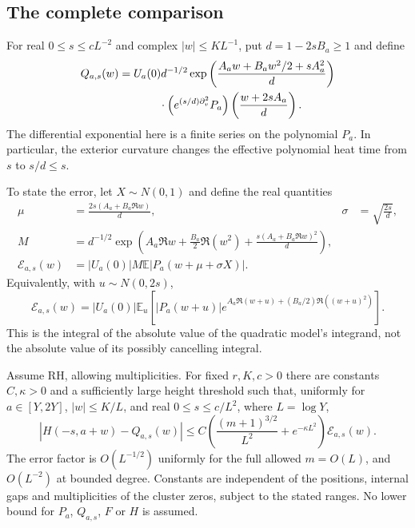 \subsection{The complete comparison}
\label{na-comparison-subsection}

For real $0\le s\le cL^{-2}$ and complex $|w|\le KL^{-1}$, put
$d=1-2sB_a\ge1$ and define
\begin{equation}
 \begin{split}
 Q_{a,s}(w)={}&U_a(0)d^{-1/2}
 \exp\left(\frac{A_aw+B_aw^2/2+sA_a^2}{d}\right)\\
 &\hspace{8mm}\cdot
 \left(e^{(s/d)\partial_v^2}P_a\right)
                  \left(\frac{w+2sA_a}{d}\right).
 \end{split}
 \label{na-quadratic-model}
\end{equation}
The differential exponential here is a finite series on the polynomial
$P_a$. In particular, the exterior curvature changes the effective
polynomial heat time from $s$ to $s/d\le s$.

To state the error, let $X\sim N(0,1)$ and define the real quantities
\begin{align}
 \mu&=\frac{2s(A_a+B_a\Re w)}d,&
 \sigma&=\sqrt{\frac{2s}d},
 \label{na-real-tilt}\\
 M&=d^{-1/2}\exp\left(A_a\Re w+\frac{B_a}2\Re(w^2)
                  +\frac{s(A_a+B_a\Re w)^2}d\right),
 \nonumber\\[-2mm]
 \mathcal E_{a,s}(w)&=|U_a(0)|M
                      \mathbb E|P_a(w+\mu+\sigma X)|.
 \label{na-absolute-envelope}
\end{align}
Equivalently, with $u\sim N(0,2s)$,
\begin{equation}
 \mathcal E_{a,s}(w)=|U_a(0)|\mathbb E_u
 \left[|P_a(w+u)|
 e^{A_a\Re(w+u)+(B_a/2)\Re((w+u)^2)}\right].
 \label{na-envelope-integral}
\end{equation}
This is the integral of the absolute value of the quadratic model's
integrand, not the absolute value of its possibly cancelling integral.

\begin{theorem}
\label{na-main-theorem}
\label{thm:na-comparison}
Assume RH, allowing multiplicities. For fixed $r,K,c>0$ there are
constants $C,\kappa>0$ and a sufficiently large height threshold such
that, uniformly for $a\in[Y,2Y]$, $|w|\le K/L$, and real
$0\le s\le c/L^2$, where $L=\log Y$,
\begin{equation}
 \boxed{\left|H(-s,a+w)-Q_{a,s}(w)\right|
 \le C\left(\frac{(m+1)^{3/2}}{L^2}+e^{-\kappa L^2}\right)
                         \mathcal E_{a,s}(w).}
 \label{na-main-estimate}
\end{equation}
The error factor is $O(L^{-1/2})$ uniformly for the full allowed
$m=O(L)$, and $O(L^{-2})$ at bounded degree. Constants are independent
of the positions, internal gaps and multiplicities of the cluster
zeros, subject to the stated ranges. No lower bound for $P_a$,
$Q_{a,s}$, $F$ or $H$ is assumed.
\end{theorem}

